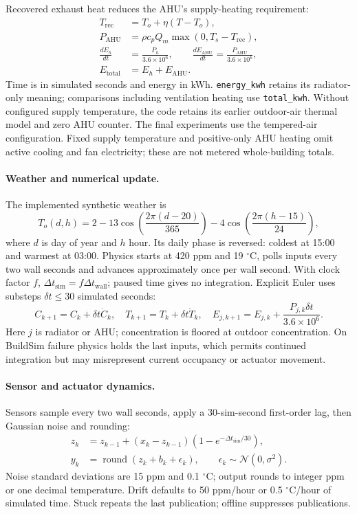\documentclass[11pt,a4paper]{article}
\begin{document}
Recovered exhaust heat reduces the AHU's supply-heating requirement:
\begin{align}
T_{\mathrm{rec}}&=T_o+\eta(T-T_o),\\
P_{\mathrm{AHU}}&=\rho c_pQ_m\max(0,T_s-T_{\mathrm{rec}}),\\
\frac{dE_h}{dt}&=\frac{P_h}{3.6\times10^6},\qquad
\frac{dE_{\mathrm{AHU}}}{dt}=\frac{P_{\mathrm{AHU}}}{3.6\times10^6},\\
E_{\mathrm{total}}&=E_h+E_{\mathrm{AHU}}.
\end{align}
Time is in simulated seconds and energy in kWh. \texttt{energy\_kwh} retains its radiator-only meaning; comparisons including ventilation heating use \texttt{total\_kwh}. Without configured supply temperature, the code retains its earlier outdoor-air thermal model and zero AHU counter. The final experiments use the tempered-air configuration. Fixed supply temperature and positive-only AHU heating omit active cooling and fan electricity; these are not metered whole-building totals.

\paragraph{Weather and numerical update.}
The implemented synthetic weather is
\begin{equation}
T_o(d,h)=2-13\cos\!\left(\frac{2\pi(d-20)}{365}\right)
-4\cos\!\left(\frac{2\pi(h-15)}{24}\right),
\end{equation}
where $d$ is day of year and $h$ hour. Its daily phase is reversed: coldest at 15:00 and warmest at 03:00. Physics starts at 420 ppm and 19 $^\circ$C, polls inputs every two wall seconds and advances approximately once per wall second. With clock factor $f$, $\Delta t_{\mathrm{sim}}=f\Delta t_{\mathrm{wall}}$; paused time gives no integration. Explicit Euler uses substeps $\delta t\leq30$ simulated seconds:
\begin{equation}
C_{k+1}=C_k+\delta t\dot C_k,\quad T_{k+1}=T_k+\delta t\dot T_k,\quad
E_{j,k+1}=E_{j,k}+\frac{P_{j,k}\delta t}{3.6\times10^6}.
\end{equation}
Here $j$ is radiator or AHU; concentration is floored at outdoor concentration. On BuildSim failure physics holds the last inputs, which permits continued integration but may misrepresent current occupancy or actuator movement.

\paragraph{Sensor and actuator dynamics.}
Sensors sample every two wall seconds, apply a 30-sim-second first-order lag, then Gaussian noise and rounding:
\begin{align}
z_k&=z_{k-1}+(x_k-z_{k-1})(1-e^{-\Delta t_{\mathrm{sim}}/30}),\\
y_k&=\operatorname{round}(z_k+b_k+\epsilon_k),\qquad
\epsilon_k\sim\mathcal N(0,\sigma^2).
\end{align}
Noise standard deviations are 15 ppm and 0.1 $^\circ$C; output rounds to integer ppm or one decimal temperature. Drift defaults to 50 ppm/hour or 0.5 $^\circ$C/hour of simulated time. Stuck repeats the last publication; offline suppresses publications.
\end{document}

